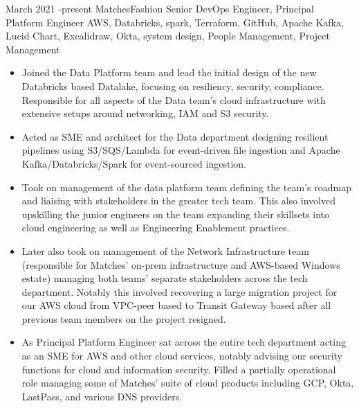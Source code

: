 \documentclass[10pt]{article} %
\begin{document}
\jobheader
{March 2021 -}{present}
{MatchesFashion}
{Senior DevOps Engineer, Principal Platform Engineer}
{
      AWS, Databricks, spark, Terraform, GitHub, Apache Kafka, Lucid Chart, Excalidraw,
      Okta, system design, People Management, Project Management
}
  \begin{itemize}

      \item Joined the Data Platform team and lead the initial design of the new Databricks based
            Datalake, focusing on resiliency, security, compliance. Responsible for all aspects
            of the Data team's cloud infrastructure with extensive setups around networking, IAM
            and S3 security.

      \item Acted as SME and architect for the Data department designing resilient pipelines
            using S3/SQS/Lambda for event-driven file ingestion
            and Apache Kafka/Databricks/Spark for event-sourced ingestion.

      \item Took on management of the data platform team defining
            the team's roadmap and liaising with stakeholders in the greater tech team.
            This also involved upskilling the junior engineers on the team
            expanding their skillsets into cloud engineering as well as Engineering Enablement practices.

      \item Later also took on management of the Network Infrastructure team (responsible for Matches'
            on-prem infrastructure and AWS-based Windows estate) managing both teams' separate stakeholders
            across the tech department.
            Notably this involved recovering a large migration project for our AWS cloud from VPC-peer
            based to Transit Gateway based after all previous team members on the project resigned.

      \item As Principal Platform Engineer sat across the entire tech department acting as an
            SME for AWS and other cloud services, notably advising our security functions for cloud
            and information security. Filled a partially operational role managing some of Matches'
            suite of cloud products including GCP, Okta, LastPass, and various DNS providers.

  \end{itemize}
\end{document}
